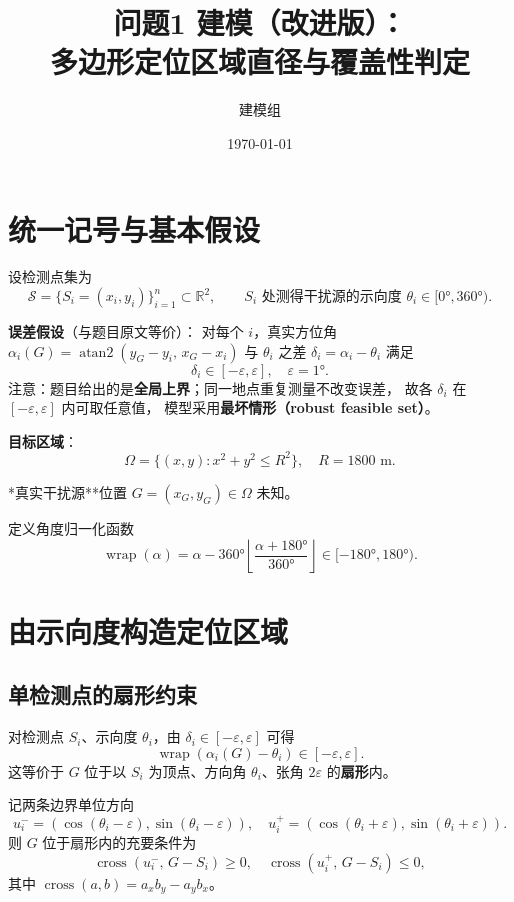 \documentclass[a4paper,11pt]{article}
\title{问题1 建模（改进版）：\\ 多边形定位区域直径与覆盖性判定}
\author{建模组}
\date{\today}
\begin{document}
\maketitle

\section{统一记号与基本假设}

设检测点集为
\[
\mathcal{S}=\{S_i=(x_i,y_i)\}_{i=1}^{n}\subset\mathbb R^2,
\qquad
S_i \text{ 处测得干扰源的示向度 } \theta_i\in[0°,360°).
\]

\noindent\textbf{误差假设}（与题目原文等价）：
对每个 $i$，真实方位角 $\alpha_i(G)=\operatorname{atan2}(y_G-y_i,\,x_G-x_i)$ 与
$\theta_i$ 之差 $\delta_i=\alpha_i-\theta_i$ 满足
\[
\delta_i\in[-\varepsilon,\varepsilon],\quad \varepsilon=1°.
\]
\noindent 注意：题目给出的是\textbf{全局上界}；同一地点重复测量不改变误差，
故各 $\delta_i$ 在 $[-\varepsilon,\varepsilon]$ 内可取任意值，
模型采用\textbf{最坏情形（robust feasible set）}。

\noindent\textbf{目标区域}：
\[
\Omega=\{(x,y):x^2+y^2\le R^2\},\quad R=1800\text{ m}.
\]

\noindent\n**真实干扰源**位置 $G=(x_G,y_G)\in\Omega$ 未知。

定义角度归一化函数
\[
\operatorname{wrap}(\alpha)=\alpha-360°\left\lfloor\frac{\alpha+180°}{360°}\right\rfloor
\in[-180°,180°).
\]

\section{由示向度构造定位区域}

\subsection{单检测点的扇形约束}

对检测点 $S_i$、示向度 $\theta_i$，由 $\delta_i\in[-\varepsilon,\varepsilon]$ 可得
\[
\operatorname{wrap}(\alpha_i(G)-\theta_i)\in[-\varepsilon,\varepsilon].
\]
这等价于 $G$ 位于以 $S_i$ 为顶点、方向角 $\theta_i$、张角 $2\varepsilon$ 的\textbf{扇形}内。

记两条边界单位方向
\[
u_i^{-}=(\cos(\theta_i-\varepsilon),\sin(\theta_i-\varepsilon)),\quad
u_i^{+}=(\cos(\theta_i+\varepsilon),\sin(\theta_i+\varepsilon)).
\]
则 $G$ 位于扇形内的充要条件为
\begin{equation}
\operatorname{cross}(u_i^{-},\,G-S_i)\ge 0,\quad
\operatorname{cross}(u_i^{+},\,G-S_i)\le 0,
\label{eq:sector}
\end{equation}
其中 $\operatorname{cross}(a,b)=a_xb_y-a_yb_x$。
\end{document}
